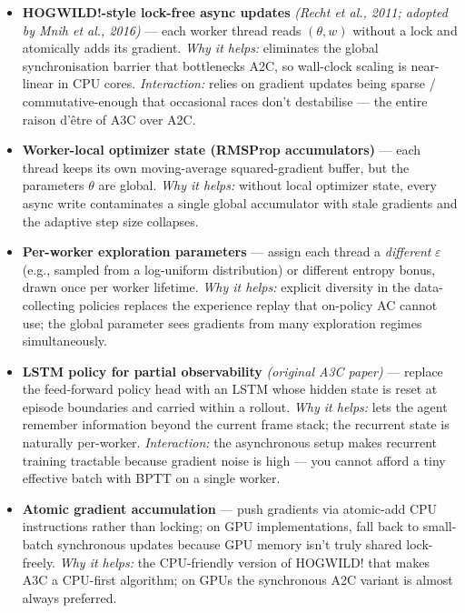 \documentclass[11pt]{article}
\begin{document}
\begin{itemize}
\item
  \label{trick-4-4-1}\textbf{HOGWILD!-style lock-free
  async updates} \emph{(Recht et al., 2011; adopted by Mnih et al.,
  2016)} --- each worker thread reads \((\theta, w)\) without a lock and
  atomically adds its gradient. \emph{Why it helps:} eliminates the
  global synchronisation barrier that bottlenecks A2C, so wall-clock
  scaling is near-linear in CPU cores. \emph{Interaction:} relies on
  gradient updates being sparse / commutative-enough that occasional
  races don't destabilise --- the entire raison d'être of A3C over A2C.
\item
  \label{trick-4-4-2}\textbf{Worker-local optimizer state
  (RMSProp accumulators)} --- each thread keeps its own moving-average
  squared-gradient buffer, but the parameters \(\theta\) are global.
  \emph{Why it helps:} without local optimizer state, every async write
  contaminates a single global accumulator with stale gradients and the
  adaptive step size collapses.
\item
  \label{trick-4-4-3}\textbf{Per-worker exploration
  parameters} --- assign each thread a \emph{different} \(\varepsilon\)
  (e.g., sampled from a log-uniform distribution) or different entropy
  bonus, drawn once per worker lifetime. \emph{Why it helps:} explicit
  diversity in the data-collecting policies replaces the experience
  replay that on-policy AC cannot use; the global parameter sees
  gradients from many exploration regimes simultaneously.
\item
  \label{trick-4-4-4}\textbf{LSTM policy for partial
  observability} \emph{(original A3C paper)} --- replace the
  feed-forward policy head with an LSTM whose hidden state is reset at
  episode boundaries and carried within a rollout. \emph{Why it helps:}
  lets the agent remember information beyond the current frame stack;
  the recurrent state is naturally per-worker. \emph{Interaction:} the
  asynchronous setup makes recurrent training tractable because gradient
  noise is high --- you cannot afford a tiny effective batch with BPTT
  on a single worker.
\item
  \label{trick-4-4-5}\textbf{Atomic gradient
  accumulation} --- push gradients via atomic-add CPU instructions
  rather than locking; on GPU implementations, fall back to small-batch
  synchronous updates because GPU memory isn't truly shared lock-freely.
  \emph{Why it helps:} the CPU-friendly version of HOGWILD! that makes
  A3C a CPU-first algorithm; on GPUs the synchronous A2C variant is
  almost always preferred.
\end{itemize}
\end{document}
